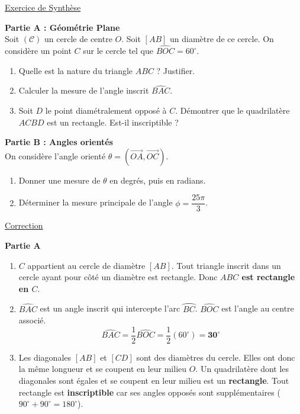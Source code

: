 \documentclass[12pt,a4paper]{article}
\begin{document}
\begin{center}
    \textcolor{monRouge}{\underline{\Large Exercice de Synthèse}}
\end{center}

\noindent \textbf{Partie A : Géométrie Plane} \\
Soit $(\mathcal{C})$ un cercle de centre $O$. Soit $[AB]$ un diamètre de ce cercle. On considère un point $C$ sur le cercle tel que $\widehat{BOC} = 60^\circ$.
\begin{enumerate}
    \item Quelle est la nature du triangle $ABC$ ? Justifier.
    \item Calculer la mesure de l'angle inscrit $\widehat{BAC}$.
    \item Soit $D$ le point diamétralement opposé à $C$. Démontrer que le quadrilatère $ACBD$ est un rectangle. Est-il inscriptible ?
\end{enumerate}

\noindent \textbf{Partie B : Angles orientés} \\
On considère l'angle orienté $\theta = (\overrightarrow{OA}, \overrightarrow{OC})$.
\begin{enumerate}
    \item Donner une mesure de $\theta$ en degrés, puis en radians.
    \item Déterminer la mesure principale de l'angle $\phi = \dfrac{25\pi}{3}$.
\end{enumerate}

\vspace{1.5em}

\begin{center}
    \textcolor{monRouge}{\underline{\Large Correction}}
\end{center}

\noindent \textbf{Partie A}
\begin{enumerate}
    \item $C$ appartient au cercle de diamètre $[AB]$. Tout triangle inscrit dans un cercle ayant pour côté un diamètre est rectangle. Donc \textbf{$ABC$ est rectangle en $C$}.
    \item $\widehat{BAC}$ est un angle inscrit qui intercepte l'arc $\wideparen{BC}$. $\widehat{BOC}$ est l'angle au centre associé.
    \[ \widehat{BAC} = \frac{1}{2} \widehat{BOC} = \frac{1}{2} (60^\circ) = \mathbf{30^\circ} \]
    \item Les diagonales $[AB]$ et $[CD]$ sont des diamètres du cercle. Elles ont donc la même longueur et se coupent en leur milieu $O$. Un quadrilatère dont les diagonales sont égales et se coupent en leur milieu est un \textbf{rectangle}.
    Tout rectangle est \textbf{inscriptible} car ses angles opposés sont supplémentaires ($90^\circ + 90^\circ = 180^\circ$).
\end{enumerate}
\end{document}
